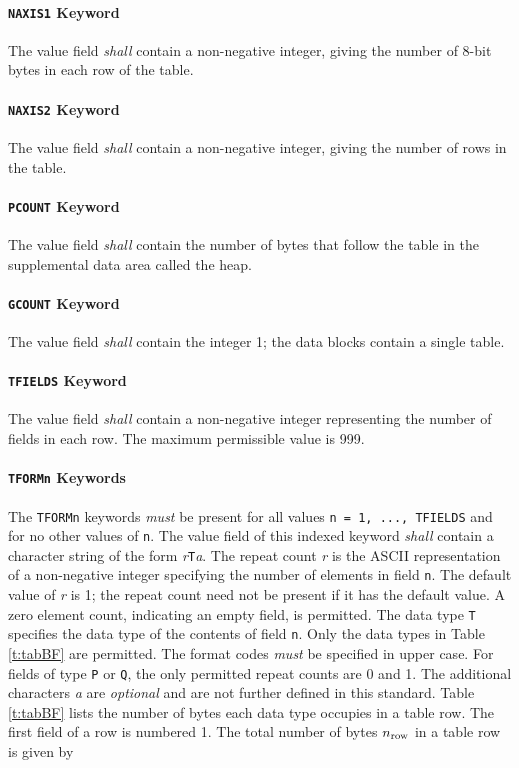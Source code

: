 \documentclass[11pt,makeidx]{book}     %
\begin{document}
   \paragraph{{\tt NAXIS1} Keyword}
 The value field {\em shall} contain a non-negative integer, 
 giving
 the number of 8-bit bytes in each row of the table.
  
   \paragraph{{\tt NAXIS2} Keyword}
 The value field {\em shall} contain a non-negative integer, 
 giving
 the number of rows in the table.
  
   \paragraph{{\tt PCOUNT} Keyword}
 The value field {\em shall} contain the number of bytes 
 that follow the table in the supplemental data area called the heap. 
 

   \paragraph{{\tt GCOUNT} Keyword}
 The value field {\em shall} contain the integer 1; the
 data blocks contain a single table.
  
   \paragraph{{\tt TFIELDS} Keyword}
 The value field {\em shall} contain a non-negative integer 
 representing
 the number of fields in each row.  The maximum
 permissible value is 999.
  
   \paragraph{{\tt TFORMn} Keywords}
 The {\tt TFORMn} keywords {\em must} be present for all values 
 {\tt n = 1, ..., TFIELDS} and for no other values of {\tt n}.
 The value field of this indexed keyword {\em shall} contain a
 character string of the form {\em r}{\tt T}{\em a}.  
 The repeat count {\em r} is
 the ASCII representation of a non-negative integer 
 specifying the number of elements in field {\tt n}.
 The default value of {\em r} is 1; the repeat count need not be present
 if it has the default value.  A zero element count, indicating an              
 empty field, is permitted.
 The data type {\tt T} specifies the data type of the contents of field
 {\tt n}.  Only the data types in Table \ref{t:tabBF} are permitted. 
 The format codes {\em must} be specified in upper case.  For
 fields of type {\tt P} or {\tt Q}, the only permitted repeat counts are 0 and 1. The
 additional characters {\em a} are {\em optional}  and are not further defined
 in this standard.  Table \ref{t:tabBF} lists the number of bytes each
 data type occupies in a table row. The first field of a row is
 numbered 1. The total number of bytes $n_{\rm row}$ 
 in a table row is given by
\end{document}
